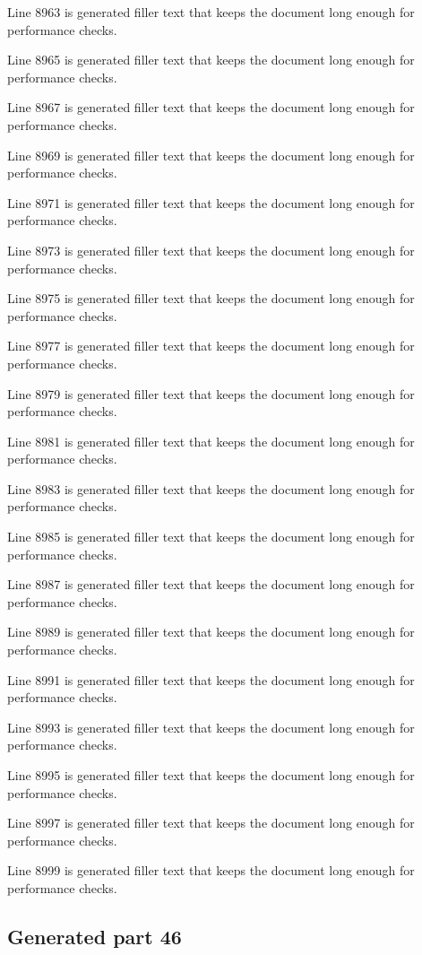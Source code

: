 Line 8963 is generated filler text that keeps the document long enough for performance checks.

Line 8965 is generated filler text that keeps the document long enough for performance checks.

Line 8967 is generated filler text that keeps the document long enough for performance checks.

Line 8969 is generated filler text that keeps the document long enough for performance checks.

Line 8971 is generated filler text that keeps the document long enough for performance checks.

Line 8973 is generated filler text that keeps the document long enough for performance checks.

Line 8975 is generated filler text that keeps the document long enough for performance checks.

Line 8977 is generated filler text that keeps the document long enough for performance checks.

Line 8979 is generated filler text that keeps the document long enough for performance checks.

Line 8981 is generated filler text that keeps the document long enough for performance checks.

Line 8983 is generated filler text that keeps the document long enough for performance checks.

Line 8985 is generated filler text that keeps the document long enough for performance checks.

Line 8987 is generated filler text that keeps the document long enough for performance checks.

Line 8989 is generated filler text that keeps the document long enough for performance checks.

Line 8991 is generated filler text that keeps the document long enough for performance checks.

Line 8993 is generated filler text that keeps the document long enough for performance checks.

Line 8995 is generated filler text that keeps the document long enough for performance checks.

Line 8997 is generated filler text that keeps the document long enough for performance checks.

Line 8999 is generated filler text that keeps the document long enough for performance checks.

\subsection{Generated part 46}


